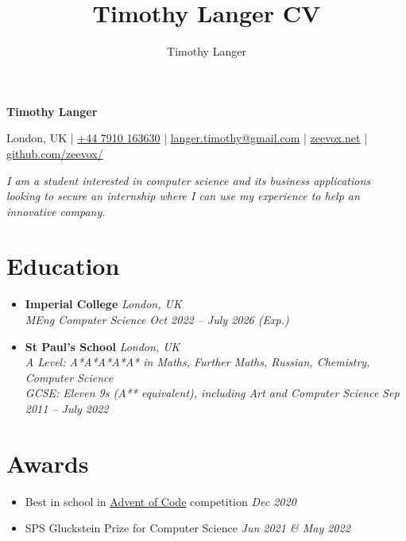 \documentclass[11pt,twoside,a4paper]{book}
\author{Timothy Langer}
\title{Timothy Langer CV}
\newcommand{\cvdate}[1] {\hfill {\color{gray} \mdseries \slshape \normalsize #1}}
\begin{document}
{\huge \bfseries Timothy Langer}

\vspace{1.5ex}

London, UK | \href{tel:+447910163630}{+44 7910 163630} | \href{mailto:langer.timothy@gmail.com}{langer.timothy@gmail.com} | \href{https://zeevox.net}{zeevox.net} | \href{https://github.com/zeevox/}{github.com/zeevox/}

\vspace{1ex}

\textsl{I am a student interested in computer science and its business applications looking to secure an internship where I can use my experience to help an innovative company.}

\vspace{1ex}

\section*{Education}

\begin{itemize}
  \item \textbf{Imperial College} \cvdate{London, UK} \\
    {\small \textit{MEng Computer Science}}
    \cvdate{\small Oct 2022 -- July 2026 (Exp.)}
  \item \textbf{St Paul's School} \cvdate{London, UK} \\ 
    {\small \textit{A Level: A*A*A*A*A* in Maths, Further Maths, Russian, Chemistry, Computer Science} \\
    \textit{GCSE: Eleven 9s (A** equivalent), including Art and Computer Science}} 
    \cvdate{\small Sep 2011 -- July 2022} 
\end{itemize}

\section*{Awards}

\begin{itemize}
  \itemsep-0.2em
  \item Best in school in \href{https://adventofcode.com/2020/about}{Advent of Code} competition \cvdate{Dec 2020}
  \item SPS Gluckstein Prize for Computer Science \cvdate{Jun 2021 \& May 2022}
\end{itemize}
\end{document}
